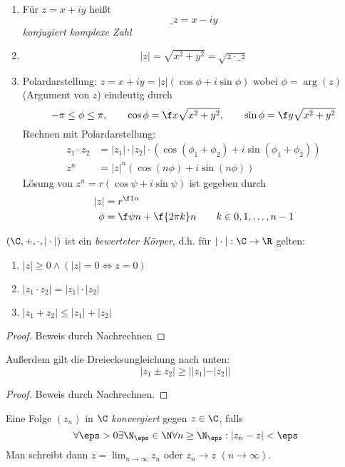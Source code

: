 \documentclass[a4paper,10pt]{scrartcl}
\begin{document}
\begin{df}
	\label{df:1.3}
	\begin{enumerate}
		\item 
			Für $z=x+iy$ heißt
			\[
				\_z = x-iy
			\]
			\emph{konjugiert komplexe Zahl}
		\item
			\[
				|z| = \sqrt{x^2+y^2} = \sqrt{z\cdot \_z}
			\]
		\item
			Polardarstellung: $z=x+iy = |z|(\cos \phi + i\sin\phi)$ wobei $\phi = \arg(z)$ (Argument von $z$) eindeutig durch
			\[
			-\pi \le \phi \le \pi, \qquad \cos\phi = \f x{\sqrt{x^2+y^2}}, \qquad \sin\phi = \f y{\sqrt{x^2+y^2}}
			\]
			Rechnen mit Polardarstellung:
			\begin{align*}
				z_1 \cdot z_2 &= |z_1|\cdot |z_2|\cdot (\cos(\phi_1+\phi_2) + i\sin(\phi_1+\phi_2))\\
				z^n &= |z|^n (\cos(n\phi) + i\sin(n\phi))
			\end{align*}
			Lösung von $z^n=r(\cos\psi + i\sin\psi)$ ist gegeben durch
			\begin{align*}
				|z| &= r^{\f 1n}\\
				\phi &= \f \psi n + \f {2\pi k}n \qquad k\in 0,1,\dotsc, n-1
			\end{align*}
	\end{enumerate}
\end{df}

\begin{st}
	\label{st:1.4}
	$(\C, +, \cdot, |\cdot|)$ ist ein \emph{bewerteter Körper}, d.h. für $|\cdot|: \C \to \R$ gelten:
	\begin{enumerate}
		\item $|z| \ge 0 \land (|z| = 0 \iff z = 0)$
		\item $|z_1\cdot z_2| = |z_1|\cdot |z_2|$
		\item $|z_1+z_2| \le |z_1| + |z_2|$
	\end{enumerate}
	\begin{proof}
		Beweis durch Nachrechnen
	\end{proof}
	\begin{note}
		Außerdem gilt die Dreiecksungleichung nach unten:
		\[
			|z_1 \pm z_2| \ge ||z_1| - |z_2||
		\]
		\begin{proof}
			Beweis durch Nachrechnen.
		\end{proof}
	\end{note}
\end{st}

\begin{df}
	\label{df:1.5}
	Eine Folge $(z_n)$ in $\C$ \emph{konvergiert} gegen $z\in \C$, falls
	\[
		\forall \eps > 0 \exists \N_\eps\in \N \forall n\ge \N_\eps : |z_n -z| < \eps
	\]
	Man schreibt dann $z = \lim_{n\to \infty} z_n$ oder $z_n \to z$ $(n\to \infty)$.
\end{df}
\end{document}
